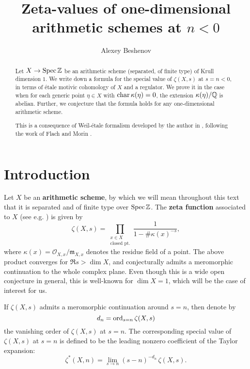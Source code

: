 \documentclass{article}
\title{Zeta-values of one-dimensional arithmetic schemes at $n < 0$}
\author{Alexey Beshenov}
\numberwithin{equation}{section}
\begin{document}
\maketitle

\begin{abstract}
  Let $X \to \operatorname{Spec} \mathbb{Z}$ be an arithmetic scheme (separated, of finite type) of
  Krull dimension $1$. We write down a formula for the special value of
  $\zeta (X,s)$ at $s = n < 0$, in terms of étale motivic cohomology of $X$ and
  a regulator. We prove it in the case when for each generic point $\eta \in X$
  with $\operatorname{char} \kappa (\eta) = 0$, the extension $\kappa (\eta)/\mathbb{Q}$ is
  abelian. Further, we conjecture that the formula holds for any one-dimensional
  arithmetic scheme.

  This is a consequence of Weil-étale formalism developed by the author in
  \cite{Beshenov-Weil-etale-1,Beshenov-Weil-etale-2}, following the work of
  Flach and Morin \cite{Flach-Morin-2018}.
\end{abstract}

\tableofcontents


\section{Introduction}

Let $X$ be an \textbf{arithmetic scheme}, by which we will mean throughout this
text that it is separated and of finite type over $\operatorname{Spec} \mathbb{Z}$.
The \textbf{zeta function} associated to $X$ (see e.g. \cite{Serre-1965}) is
given by
\[ \zeta (X,s) = \prod_{\substack{x \in X \\ \text{closed pt.}}}
  \frac{1}{1 - \#\kappa (x)^{-s}}, \]
where $\kappa (x) = \mathcal{O}_{X,x}/\mathfrak{m}_{X,x}$ denotes the residue
field of a point. The above product converges for $\Re s > \dim X$, and
conjecturally admits a meromorphic continuation to the whole complex plane.
Even though this is a wide open conjecture in general, this is well-known for
$\dim X = 1$, which will be the case of interest for us.

If $\zeta (X,s)$ admits a meromorphic continuation around $s = n$, then denote
by
\begin{equation}
  \label{eqn:vanishing-order}
  d_n = \operatorname{ord}_{s=n} \zeta (X,s)
\end{equation}
the vanishing order of $\zeta (X,s)$ at $s = n$. The corresponding special value
of $\zeta (X,s)$ at $s = n$ is defined to be the leading nonzero coefficient of
the Taylor expansion:
$$\zeta^* (X,n) = \lim_{s \to n} (s - n)^{-d_n}\,\zeta (X,s).$$
\end{document}
